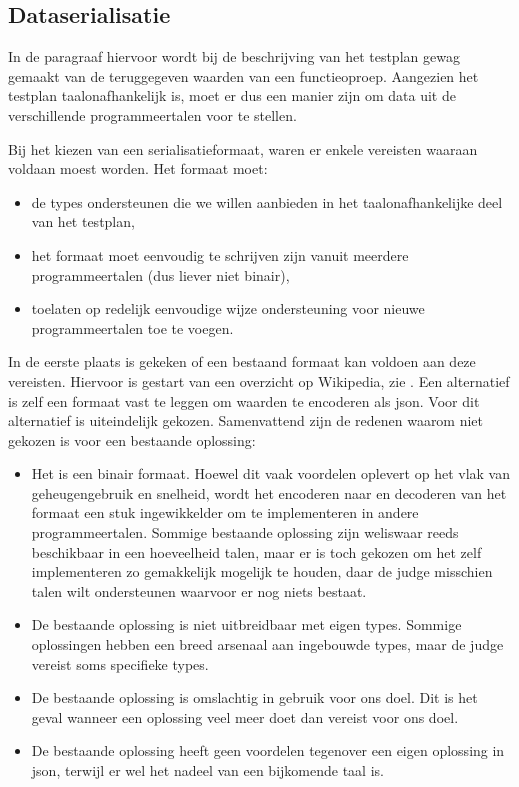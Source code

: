 \subsection{Dataserialisatie}\label{subsec:dataserialisatie}

In de paragraaf hiervoor wordt bij de beschrijving van het testplan gewag gemaakt van de teruggegeven waarden van een functieoproep.
Aangezien het testplan taalonafhankelijk is, moet er dus een manier zijn om data uit de verschillende programmeertalen voor te stellen.

Bij het kiezen van een serialisatieformaat, waren er enkele vereisten waaraan voldaan moest worden.
Het formaat moet:

\begin{itemize}
    \item de types ondersteunen die we willen aanbieden in het taalonafhankelijke deel van het testplan,
    \item het formaat moet eenvoudig te schrijven zijn vanuit meerdere programmeertalen (dus liever niet binair),
    \item toelaten op redelijk eenvoudige wijze ondersteuning voor nieuwe programmeertalen toe te voegen.
\end{itemize}

In de eerste plaats is gekeken of een bestaand formaat kan voldoen aan deze vereisten.
Hiervoor is gestart van een overzicht op Wikipedia, zie \autocite{wiki2020}.
Een alternatief is zelf een formaat vast te leggen om waarden te encoderen als json.
Voor dit alternatief is uiteindelijk gekozen.
Samenvattend zijn de redenen waarom niet gekozen is voor een bestaande oplossing:

\begin{itemize}
    \item Het is een binair formaat.
    Hoewel dit vaak voordelen oplevert op het vlak van geheugengebruik en snelheid, wordt het encoderen naar en decoderen van het formaat een stuk ingewikkelder om te implementeren in andere programmeertalen.
    Sommige bestaande oplossing zijn weliswaar reeds beschikbaar in een hoeveelheid talen, maar er is toch gekozen om het zelf implementeren zo gemakkelijk mogelijk te houden, daar de judge misschien talen wilt ondersteunen waarvoor er nog niets bestaat.
    \item De bestaande oplossing is niet uitbreidbaar met eigen types.
    Sommige oplossingen hebben een breed arsenaal aan ingebouwde types, maar de judge vereist soms specifieke types.
    \item De bestaande oplossing is omslachtig in gebruik voor ons doel.
    Dit is het geval wanneer een oplossing veel meer doet dan vereist voor ons doel.
    \item De bestaande oplossing heeft geen voordelen tegenover een eigen oplossing in json, terwijl er wel het nadeel van een bijkomende taal is.
\end{itemize}

